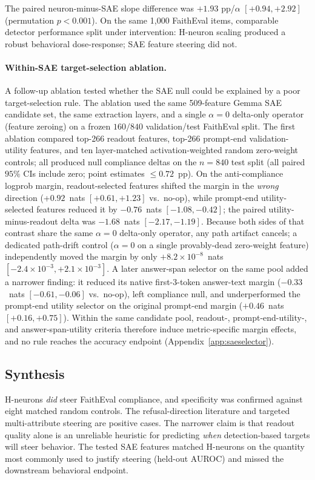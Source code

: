 \documentclass{article}
\begin{document}
The paired neuron-minus-SAE slope difference was $+1.93$ pp/$\alpha$ $[+0.94, +2.92]$ (permutation $p < 0.001$).
On the same 1,000 FaithEval items, comparable detector performance split under intervention: H-neuron scaling produced a robust behavioral dose-response; SAE feature steering did not.

\paragraph{Within-SAE target-selection ablation.}
A follow-up ablation tested whether the SAE null could be explained by a poor target-selection rule.
The ablation used the same 509-feature Gemma SAE candidate set, the same extraction layers, and a single $\alpha = 0$ delta-only operator (feature zeroing) on a frozen $160/840$ validation/test FaithEval split.
The first ablation compared top-266 readout features, top-266 prompt-end validation-utility features, and ten layer-matched activation-weighted random zero-weight controls; all produced null compliance deltas on the $n = 840$ test split (all paired $95\%$ CIs include zero; point estimates $\le 0.72$~pp).
On the anti-compliance logprob margin, readout-selected features shifted the margin in the \emph{wrong} direction (+$0.92$~nats $[+0.61, +1.23]$ vs.\ no-op), while prompt-end utility-selected features reduced it by $-0.76$~nats $[-1.08, -0.42]$; the paired utility-minus-readout delta was $-1.68$~nats $[-2.17, -1.19]$.
Because both sides of that contrast share the same $\alpha = 0$ delta-only operator, any path artifact cancels; a dedicated path-drift control ($\alpha = 0$ on a single provably-dead zero-weight feature) independently moved the margin by only $+8.2\times 10^{-8}$~nats $[-2.4\times10^{-3}, +2.1\times10^{-3}]$.
A later answer-span selector on the same pool added a narrower finding: it reduced its native first-3-token answer-text margin ($-0.33$~nats $[-0.61, -0.06]$ vs.\ no-op), left compliance null, and underperformed the prompt-end utility selector on the original prompt-end margin ($+0.46$~nats $[+0.16, +0.75]$).
Within the same candidate pool, readout-, prompt-end-utility-, and answer-span-utility criteria therefore induce metric-specific margin effects, and no rule reaches the accuracy endpoint (Appendix~\ref{app:saeselector}).

\subsection{Synthesis}

H-neurons \emph{did} steer FaithEval compliance, and specificity was confirmed against eight matched random controls.
The refusal-direction literature \citep{arditi2024refusal} and targeted multi-attribute steering \citep{nguyen2025matsteer} are positive cases.
The narrower claim is that readout quality alone is an unreliable heuristic for predicting \emph{when} detection-based targets will steer behavior.
The tested SAE features matched H-neurons on the quantity most commonly used to justify steering (held-out AUROC) and missed the downstream behavioral endpoint.
\end{document}

